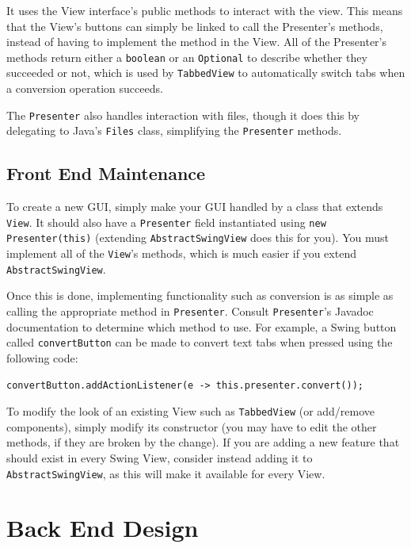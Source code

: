 \documentclass[11pt]{article}
\begin{document}
It uses the View interface's public methods to interact with the view.  This means that the View's buttons can simply be linked to call the Presenter's methods, instead of having to implement the method in the View.  All of the Presenter's methods return either a \texttt{boolean} or an \texttt{Optional} to describe whether they succeeded or not, which is used by \texttt{TabbedView} to automatically switch tabs when a conversion operation succeeds.

The \texttt{Presenter} also handles interaction with files, though it does this by delegating to Java's \texttt{Files} class, simplifying the \texttt{Presenter} methods.
\subsection{Front End Maintenance}
\label{sec:orgf939879}
To create a new GUI, simply make your GUI handled by a class that extends \texttt{View}.  It should also have a \texttt{Presenter} field instantiated using \texttt{new Presenter(this)} (extending \texttt{AbstractSwingView} does this for you).  You must implement all of the \texttt{View}'s methods, which is much easier if you extend \texttt{AbstractSwingView}.

Once this is done, implementing functionality such as conversion is as simple as calling the appropriate method in \texttt{Presenter}.  Consult \texttt{Presenter}'s Javadoc documentation to determine which method to use.  For example, a Swing button called \texttt{convertButton} can be made to convert text tabs when pressed using the following code:
\begin{verbatim}
convertButton.addActionListener(e -> this.presenter.convert());
\end{verbatim}

To modify the look of an existing View such as \texttt{TabbedView} (or add/remove components), simply modify its constructor (you may have to edit the other methods, if they are broken by the change).  If you are adding a new feature that should exist in every Swing View, consider instead adding it to \texttt{AbstractSwingView}, as this will make it available for every View.

\newpage

\section{Back End Design}
\label{sec:org383671e}
\end{document}
